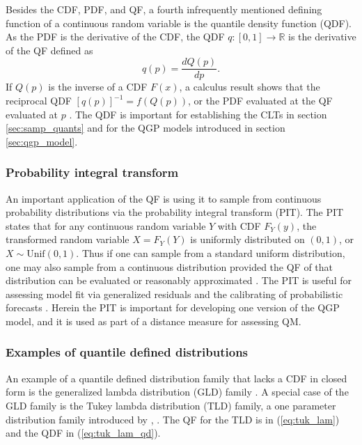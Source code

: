 Besides the CDF, PDF, and QF, a  fourth infrequently mentioned defining function 
of a continuous random variable is the quantile density function (QDF). As the 
PDF is the derivative of the CDF, the QDF $q:[0,1] \rightarrow \mathbb{R}$ is 
the derivative of the QF defined as
\[
    q(p) = \frac{dQ(p)}{dp}.
\]
If $Q(p)$ is the inverse of a CDF $F(x)$, a calculus result shows that the 
reciprocal QDF $[q(p)]^{-1} = f(Q(p))$, or the PDF evaluated at the QF 
evaluated at $p$ 
\cite[]{perepolkin2023tenets, gilchrist2000statistical}. The QDF is important 
for establishing the CLTs in section \ref{sec:samp_quants} and for the QGP 
models introduced in section \ref{sec:qgp_model}.

\subsubsection{Probability integral transform}
An important application of the QF is using it to sample from continuous 
probability distributions via the probability integral transform (PIT). The 
PIT states that for any continuous random variable $Y$ with CDF $F_Y(y)$, the 
transformed random variable $X = F_Y(Y)$ is uniformly distributed on $(0,1)$, 
or $X \sim \text{Unif}(0,1)$. Thus if one can sample from a standard uniform 
distribution, one may also sample from a continuous distribution provided the 
QF of that distribution can be evaluated or reasonably approximated 
\cite[]{wilkinson2018stochastic}. The PIT is useful for assessing model fit via 
generalized residuals \cite[]{yang2024double, cox1968general} and the 
calibrating of probabilistic forecasts \cite[]{gneiting2007probabilistic}. 
Herein the PIT is important for developing one version of the QGP model, and it 
is used as part of a distance measure for assessing QM.

\subsubsection{Examples of quantile defined distributions} \label{sec:quant_def_dist}

An example of a quantile defined distribution family that lacks a CDF in closed 
form is the generalized lambda distribution (GLD) family 
\cite[]{ramberg1974approximate, perepolkin2023tenets}. A special case of the 
GLD family is the Tukey lambda distribution (TLD) family, a one parameter 
distribution family introduced by \cite{tukey1960practical}, 
\cite[]{joiner1971some}. The QF for the TLD is in (\ref{eq:tuk_lam}) and the 
QDF in (\ref{eq:tuk_lam_qd}).   

